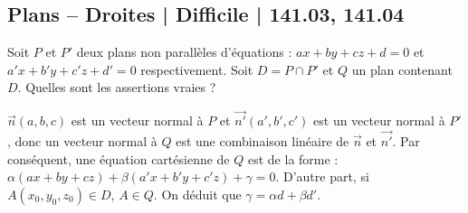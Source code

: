 \subsection{Plans -- Droites | Difficile | 141.03, 141.04}
 
\begin{question} 


Soit $P$ et $P'$ deux plans non parallèles d'équations :  $ax+by+cz+d =0$ et $a'x+b'y+c'z+d' =0$ respectivement. Soit $D=P\cap P'$ et $Q$ un plan contenant $D$. Quelles sont les assertions vraies ?
\begin{answers}
     
   
     
 
    
\end{answers}
\begin{explanations}
$\vec{n}(a,b,c)$ est un vecteur normal à $P$ et $\vec{n'}(a',b',c')$ est un vecteur normal à $P'$, donc un vecteur normal à $Q$ est une combinaison linéaire de $\vec{n}$ et $\vec{n'}$. Par conséquent, une équation cartésienne de $Q$ est de la forme :  $\alpha(ax+by+cz)+\beta(a'x+b'y+c'z) + \gamma =0.$ D'autre part, si $A(x_0,y_0,z_0) \in D$, $A \in Q$. On déduit que $\gamma = \alpha d + \beta d'$.
\end{explanations}

\end{question}
 
 
 
 
 
